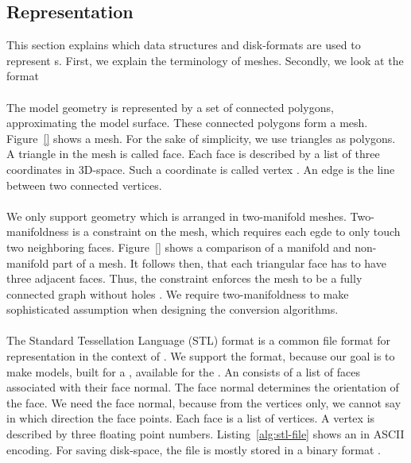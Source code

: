 \documentclass[../ClassicThesis.tex]{subfiles}
\begin{document}
\subsection{{\threedmodel} Representation}
\label{sub:model-representation}

This section explains which data structures and disk-formats are used
to represent {\threedmodel}s. First, we explain the terminology of
meshes. Secondly, we look at the {\stlfile} format\\
\\
The model geometry is represented by a set of connected polygons,
approximating the model surface. These connected polygons form a mesh.
Figure~\ref{} shows a mesh. For the sake of simplicity, we use
triangles as polygons. A triangle in the mesh is called face. Each
face is described by a list of three coordinates in 3D-space. Such a
coordinate is called vertex \cite[p.~3]{cg-intro}. An edge is the line
between two connected vertices.\\
\\
We only support geometry which is arranged in two-manifold meshes.
Two-manifoldness is a constraint on the mesh, which requires each egde
to only touch two neighboring faces. Figure~\ref{} shows a comparison
of a manifold and non-manifold part of a mesh. It follows then, that
each triangular face has to have three adjacent faces. Thus, the
constraint enforces the mesh to be a fully connected graph without
holes \cite[p.~28]{master-thesis}. We require two-manifoldness to make
sophisticated assumption when designing the conversion algorithms.\\
\\
The Standard Tessellation Language (STL) format is a common file
format for {\threedmodel} representation in the context of
{\threedprinting}. We support the {\stlfile} format, because our goal
is to make models, built for a {\threedprinter}, available for the
{\lasercutter}. An {\stlfile} consists of a list of faces associated
with their face normal. The face normal determines the orientation of
the face. We need the face normal, because from the vertices only, we
cannot say in which direction the face points. Each face is a list of
vertices. A vertex is described by three floating point numbers.
Listing~\ref{alg:stl-file} shows an {\stlfile} in ASCII encoding. For saving
disk-space, the file is
mostly stored in a binary format \cite[p.~8]{stl-file}.
\end{document}

